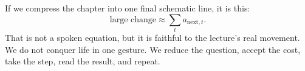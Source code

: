If we compress the chapter into one final schematic line, it is this:
\begin{equation}
\text{large change} \approx \sum_t a_{\text{next},t}.
\end{equation}
That is not a spoken equation, but it is faithful to the lecture's real movement. We do not conquer life in one gesture. We reduce the question, accept the cost, take the step, read the result, and repeat.